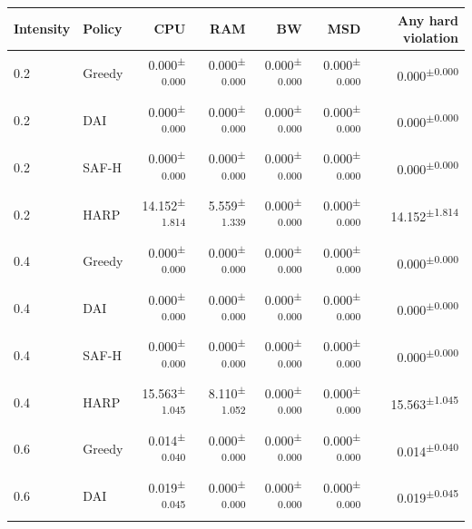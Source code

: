 \documentclass[final,5p]{elsarticle}
\begin{document}
\begin{table}[p]
\centering
\color{revisiongreen}\small
\begin{tabular}{llrrrrr}
\toprule
Intensity & Policy & CPU & RAM & BW & MSD & Any hard violation \\
\midrule
0.2 & Greedy & 0.000\textsuperscript{$\pm$0.000} & 0.000\textsuperscript{$\pm$0.000} & 0.000\textsuperscript{$\pm$0.000} & 0.000\textsuperscript{$\pm$0.000} & 0.000\textsuperscript{$\pm$0.000} \\
0.2 & DAI & 0.000\textsuperscript{$\pm$0.000} & 0.000\textsuperscript{$\pm$0.000} & 0.000\textsuperscript{$\pm$0.000} & 0.000\textsuperscript{$\pm$0.000} & 0.000\textsuperscript{$\pm$0.000} \\
0.2 & SAF-H & 0.000\textsuperscript{$\pm$0.000} & 0.000\textsuperscript{$\pm$0.000} & 0.000\textsuperscript{$\pm$0.000} & 0.000\textsuperscript{$\pm$0.000} & 0.000\textsuperscript{$\pm$0.000} \\
0.2 & HARP & 14.152\textsuperscript{$\pm$1.814} & 5.559\textsuperscript{$\pm$1.339} & 0.000\textsuperscript{$\pm$0.000} & 0.000\textsuperscript{$\pm$0.000} & 14.152\textsuperscript{$\pm$1.814} \\
0.4 & Greedy & 0.000\textsuperscript{$\pm$0.000} & 0.000\textsuperscript{$\pm$0.000} & 0.000\textsuperscript{$\pm$0.000} & 0.000\textsuperscript{$\pm$0.000} & 0.000\textsuperscript{$\pm$0.000} \\
0.4 & DAI & 0.000\textsuperscript{$\pm$0.000} & 0.000\textsuperscript{$\pm$0.000} & 0.000\textsuperscript{$\pm$0.000} & 0.000\textsuperscript{$\pm$0.000} & 0.000\textsuperscript{$\pm$0.000} \\
0.4 & SAF-H & 0.000\textsuperscript{$\pm$0.000} & 0.000\textsuperscript{$\pm$0.000} & 0.000\textsuperscript{$\pm$0.000} & 0.000\textsuperscript{$\pm$0.000} & 0.000\textsuperscript{$\pm$0.000} \\
0.4 & HARP & 15.563\textsuperscript{$\pm$1.045} & 8.110\textsuperscript{$\pm$1.052} & 0.000\textsuperscript{$\pm$0.000} & 0.000\textsuperscript{$\pm$0.000} & 15.563\textsuperscript{$\pm$1.045} \\
0.6 & Greedy & 0.014\textsuperscript{$\pm$0.040} & 0.000\textsuperscript{$\pm$0.000} & 0.000\textsuperscript{$\pm$0.000} & 0.000\textsuperscript{$\pm$0.000} & 0.014\textsuperscript{$\pm$0.040} \\
0.6 & DAI & 0.019\textsuperscript{$\pm$0.045} & 0.000\textsuperscript{$\pm$0.000} & 0.000\textsuperscript{$\pm$0.000} & 0.000\textsuperscript{$\pm$0.000} & 0.019\textsuperscript{$\pm$0.045} \\

\end{tabular}
\end{table}
\end{document}
